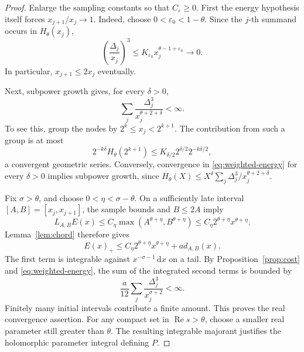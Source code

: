 \documentclass[11pt]{article}
\theoremstyle{definition}
\newcommand{\ep}{\varepsilon}
\newcommand{\Rea}{\operatorname{Re}}
\newcommand{\dd}{\,\mathrm d}
\begin{document}
\begin{proof}
Enlarge the sampling constants so that \(C_\ep\geq0\).
First the energy hypothesis itself forces
\(x_{j+1}/x_j\to1\). Indeed, choose
\(0<\ep_0<1-\theta\). Since the \(j\)-th summand occurs in
\(H_\theta(x_j)\),
\[
 \left(\frac{\Delta_j}{x_j}\right)^3
 \leq K_{\ep_0}x_j^{\theta-1+\ep_0}\longrightarrow0.
\]
In particular, \(x_{j+1}\leq2x_j\) eventually.

Next, subpower growth gives, for every \(\delta>0\),
\begin{equation}\label{eq:weighted-energy}
 \sum_j\frac{\Delta_j^3}{x_j^{\theta+2+\delta}}<\infty.
\end{equation}
To see this, group the nodes by \(2^k\leq x_j<2^{k+1}\).
The contribution from such a group is at most
\[
 2^{-k\delta}H_\theta(2^{k+1})
 \leq K_{\delta/2}2^{\delta/2}2^{-k\delta/2},
\]
a convergent geometric series. Conversely, convergence in
\eqref{eq:weighted-energy} for every \(\delta>0\) implies subpower
growth, since
\(H_\theta(X)\leq X^\delta\sum_j\Delta_j^3/x_j^{\theta+2+\delta}\).

Fix \(\sigma>\theta\), and choose
\(0<\eta<\sigma-\theta\). On a sufficiently late interval
\([A,B]=[x_j,x_{j+1}]\), the sample bounds and \(B\leq2A\) imply
\[
 L_{A,B}E(x)\leq C_\eta\max(A^{\theta+\eta},B^{\theta+\eta})
 \leq C_\eta 2^{\theta+\eta}x^{\theta+\eta}.
\]
Lemma~\ref{lem:chord} therefore gives
\[
 E(x)_+\leq C_\eta 2^{\theta+\eta}x^{\theta+\eta}
                +a d_{A,B}(x).
\]
The first term is integrable against \(x^{-\sigma-1}\dd x\) on a tail.
By Proposition~\ref{prop:cost} and \eqref{eq:weighted-energy}, the sum of
the integrated second terms is bounded by
\[
 \frac a{12}\sum_j\frac{\Delta_j^3}{x_j^{\sigma+2}}<\infty.
\]
Finitely many initial intervals contribute a finite amount. This proves
the real convergence assertion. For any compact set in \(\Rea s>\theta\),
choose a smaller real parameter still greater than \(\theta\). The
resulting integrable majorant justifies the holomorphic parameter
integral defining \(P\).
\end{proof}
\end{document}
